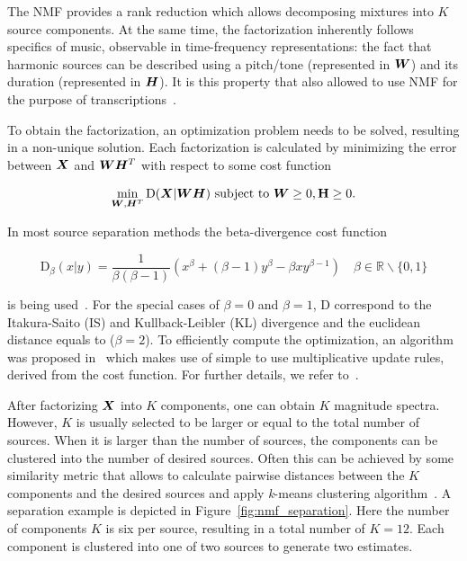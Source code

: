 The NMF provides a rank reduction which allows decomposing mixtures into \(K\) source components.
At the same time, the factorization inherently follows specifics of music, observable in time-frequency representations: the fact that harmonic sources can be described using a pitch/tone (represented in \({\bm{W}}\)) and its duration (represented in \({\bm{H}}\)).
It is this property that also allowed to use NMF for the purpose of transcriptions~\cite{smaragdis03}.
\par
To obtain the factorization, an optimization problem needs to be solved, resulting in a non-unique solution.
Each factorization is calculated by minimizing the error between \({\bm{X}}\) and \({\bm{W}} {\bm{H}}^{T}\) with respect to some cost function

\begin{equation}
  \min_{{\bm{W}},{\bm{H}}^{T}} \mathrm{D}({\bm{X}} | {\bm{W}} {\bm{H}}) \text { subject to } {\bm{W}} \geq 0 , \mathbf {{\bm{H}}} \geq 0.
\end{equation}

In most source separation methods the beta-divergence cost function

\begin{equation}
  \mathrm{D}_{\beta} (x | y) = \frac { 1 } { \beta ( \beta - 1 ) } \left( x ^ { \beta } + ( \beta - 1 ) y ^ { \beta } - \beta x y ^ { \beta - 1 } \right) \quad \beta \in \mathbb { R } \backslash \{ 0, 1 \}
\end{equation}

is being used~\cite{fitzgerald08a}. 
For the special cases of \(\beta = 0\) and \(\beta = 1\), \(\mathrm{D}\) correspond to the Itakura-Saito (IS) and Kullback-Leibler (KL) divergence and the euclidean distance equals to (\(\beta = 2\)).
To efficiently compute the optimization, an algorithm was proposed in~\cite{lee01} which makes use of simple to use multiplicative update rules, derived from the cost function.
For further details, we refer to~\cite{cichoki09}.
\par
After factorizing \({\bm{X}}\) into \(K\) components, one can obtain \(K\) magnitude spectra.
However, \(K\) is usually selected to be larger or equal to the total number of sources.
When it is larger than the number of sources, the components can be clustered into the number of desired sources.
Often this can be achieved by some similarity metric that allows to calculate pairwise distances between the \(K\) components and the desired sources and apply \textit{k}-means clustering algorithm~\cite{spiertz09}.
A separation example is depicted in Figure~\ref{fig:nmf_separation}. 
Here the number of components \(K\) is six per source, resulting in a total number of \(K=12\). 
Each component is clustered into one of two sources to generate two estimates.

